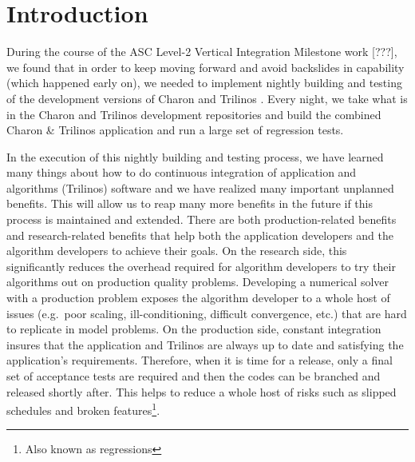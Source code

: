 \documentclass[pdf,ps2pdf,11pt]{SANDreport}
\begin{document}

%

\SANDmain %

%
\section{Introduction}
%

During the course of the ASC Level-2 Vertical Integration Milestone work
[???], we found that in order to keep moving forward and avoid backslides in
capability (which happened early on), we needed to implement nightly building
and testing of the development versions of Charon and Trilinos
{}\cite{ref:trilinos}.  Every night, we take what is in the Charon and
Trilinos development repositories and build the combined Charon {}\& Trilinos
application and run a large set of regression tests.

In the execution of this nightly building and testing process, we have learned
many things about how to do continuous integration
{}\cite{continuous-integration} of application and algorithms (Trilinos)
software and we have realized many important unplanned benefits.  This will
allow us to reap many more benefits in the future if this process is
maintained and extended.  There are both production-related benefits and
research-related benefits that help both the application developers and the
algorithm developers to achieve their goals.  On the research side, this
significantly reduces the overhead required for algorithm developers to try
their algorithms out on production quality problems.  Developing a numerical
solver with a production problem exposes the algorithm developer to a whole
host of issues (e.g.\ poor scaling, ill-conditioning, difficult convergence,
etc.) that are hard to replicate in model problems.  On the production side,
constant integration insures that the application and Trilinos are always up
to date and satisfying the application's requirements.  Therefore, when it is
time for a release, only a final set of acceptance tests are required and then
the codes can be branched and released shortly after.  This helps to reduce a
whole host of risks such as slipped schedules and broken
features\footnote{Also known as regressions}.
\end{document}
